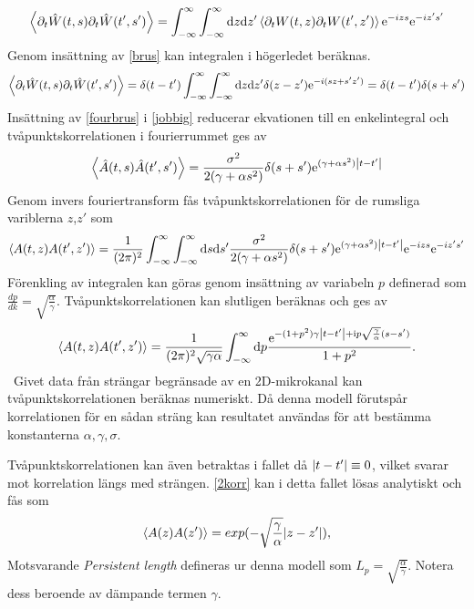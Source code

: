 \begin{equation}
    \ev{\partial_{t}\hat{W}(t,s)\partial_{t}\hat{W}(t',s')}=\int_{-\infty}^{\infty}\int_{-\infty}^{\infty}\dd z \dd z'\ev{\partial_{t}W(t,z)\partial_{t}W(t',z')}\ee^{-izs}\ee^{-iz's'}
\end{equation}
Genom insättning av \eqref{brus} kan integralen i högerledet beräknas.
\begin{equation}\label{fourbrus}
    \ev{\partial_{t}\hat{W}(t,s)\partial_{t}\hat{W}(t',s')}=\delta(t-t')\int_{-\infty}^{\infty}\int_{-\infty}^{\infty}\dd z \dd z'\delta(z-z')\ee^{-i(sz+s'z')}=\delta(t-t')\delta(s+s')
\end{equation}
Insättning av \eqref{fourbrus} i \eqref{jobbig} reducerar ekvationen till en enkelintegral och tvåpunktskorrelationen i fourierrummet ges av
\begin{equation}
    \ev{\hat{A}(t,s)\hat{A}(t',s')}=\frac{\sigma^2}{2(\gamma+\alpha s^2)}\delta(s+s')\ee^{(\gamma+\alpha s^2)\abs{t-t'}}
\end{equation}
Genom invers fouriertransform fås tvåpunktskorrelationen för de rumsliga variblerna $z$,$z'$ som
\begin{equation}
    \ev{A(t,z)A(t',z')}=\frac{1}{(2\pi)^2}\int_{-\infty}^{\infty}\int_{-\infty}^{\infty}\dd s \dd s'\frac{\sigma^2}{2(\gamma+\alpha s^2)}\delta(s+s')\ee^{(\gamma+\alpha s^2)\abs{t-t'}}\ee^{-izs}\ee^{-iz's'}
\end{equation}
Förenkling av integralen kan göras genom insättning av variabeln $p$ definerad som $\frac{dp}{dk}=\sqrt{\frac{\alpha}{\gamma}}$. Tvåpunktskorrelationen kan slutligen beräknas och ges av 
\begin{equation}
\label{2korr}
    \ev{A(t,z)A(t',z')}=\frac{1}{(2\pi)^2\sqrt{\gamma\alpha}}\int_{-\infty}^{\infty}\dd p \frac{\ee^{-(1+p^2)\gamma \abs{t-t'}+\ii p\sqrt{\frac{\gamma}{\alpha}}(s-s')}}{1+p^2}.
\end{equation}
\
Givet data från strängar begränsade av en 2D-mikrokanal kan tvåpunktskorrelationen beräknas numeriskt. Då denna modell förutspår korrelationen för en sådan sträng kan resultatet användas för att bestämma konstanterna $\alpha,\gamma,\sigma$. 

Tvåpunktskorrelationen kan även betraktas i fallet då $\abs{t-t'}\equiv 0$, vilket svarar mot korrelation längs med strängen. \eqref{2korr} kan i detta fallet lösas analytiskt och fås som
\begin{equation}
\ev{A(z)A(z')}=exp(-\sqrt{\frac{\gamma}{\alpha}}\abs{z-z'}),
\end{equation}
Motsvarande \emph{Persistent length} defineras ur denna modell som $L_{p}=\sqrt{\frac{\alpha}{\gamma}}$. Notera dess beroende av dämpande termen $\gamma$. 




